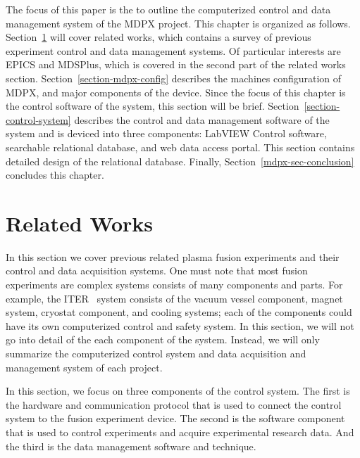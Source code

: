 The focus of this paper is the to outline the computerized control and data management system of the MDPX project. This chapter is organized as follows. Section~\ref{section-related-works} will cover related works, which contains a survey of previous experiment control and data management systems. Of particular interests are EPICS\cite{lecture:johnson_intro_to_epics} and MDSPlus\cite{stillerman1997mdsplus}, which is covered in the second part of the related works section. Section~\ref{section-mdpx-config} describes the machines configuration of MDPX, and major components of the device. Since the focus of this chapter is the control software of the system, this section will be brief. Section~\ref{section-control-system} describes the control and data management software of the system and is deviced into three components: LabVIEW Control software, searchable relational database, and web data access portal. This section contains detailed design of the relational database. Finally, Section~\ref{mdpx-sec-conclusion} concludes this chapter.


\section{Related Works}\label{section-related-works}

In this section we cover previous related plasma fusion experiments and their control and data acquisition systems. One must note that most fusion experiments are complex systems consists of many components and parts. For example, the ITER~\cite{Rebut199585} system consists of the vacuum vessel component, magnet system, cryostat component, and cooling systems; each of the components could have its own computerized control and safety system. In this section, we will not go into detail of the each component of the system. Instead, we will only summarize the computerized control system and data acquisition and management system of each project.

In this section, we focus on three components of the control system. The first is the hardware and communication protocol that is used to connect the control system to the fusion experiment device. The second is the software component that is used to control experiments and acquire experimental research data. And the third is the data management software and technique.

